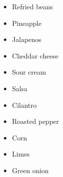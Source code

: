 \documentclass{article}
\begin{document}
\vspace{5mm}
{\selectfont 
    \begin{itemize}[noitemsep]
    
      \item[] Refried beans
      \item[] Pineapple
      \item[] Jalapenos
      \item[] Cheddar cheese
      \item[] Sour cream
      \item[] Salsa
      \item[] Cilantro
      \item[] Roasted pepper
      \item[] Corn
      \item[] Limes
      \item[] Green onion
      
    \end{itemize}
    }
\vspace{5mm}
   

\restoregeometry
\end{document}
